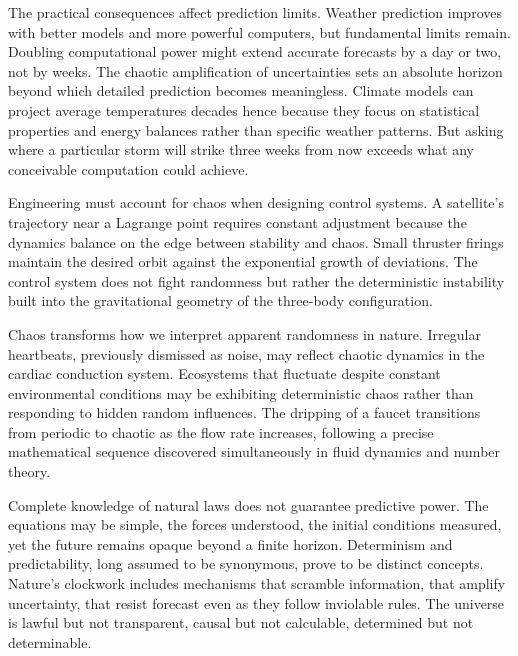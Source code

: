 The practical consequences affect prediction limits. Weather prediction improves with better models and more powerful computers, but fundamental limits remain. Doubling computational power might extend accurate forecasts by a day or two, not by weeks. The chaotic amplification of uncertainties sets an absolute horizon beyond which detailed prediction becomes meaningless. Climate models can project average temperatures decades hence because they focus on statistical properties and energy balances rather than specific weather patterns. But asking where a particular storm will strike three weeks from now exceeds what any conceivable computation could achieve.

Engineering must account for chaos when designing control systems. A satellite's trajectory near a Lagrange point requires constant adjustment because the dynamics balance on the edge between stability and chaos. Small thruster firings maintain the desired orbit against the exponential growth of deviations. The control system does not fight randomness but rather the deterministic instability built into the gravitational geometry of the three-body configuration.

Chaos transforms how we interpret apparent randomness in nature. Irregular heartbeats, previously dismissed as noise, may reflect chaotic dynamics in the cardiac conduction system. Ecosystems that fluctuate despite constant environmental conditions may be exhibiting deterministic chaos rather than responding to hidden random influences. The dripping of a faucet transitions from periodic to chaotic as the flow rate increases, following a precise mathematical sequence discovered simultaneously in fluid dynamics and number theory.

Complete knowledge of natural laws does not guarantee predictive power. The equations may be simple, the forces understood, the initial conditions measured, yet the future remains opaque beyond a finite horizon. Determinism and predictability, long assumed to be synonymous, prove to be distinct concepts. Nature's clockwork includes mechanisms that scramble information, that amplify uncertainty, that resist forecast even as they follow inviolable rules. The universe is lawful but not transparent, causal but not calculable, determined but not determinable.
